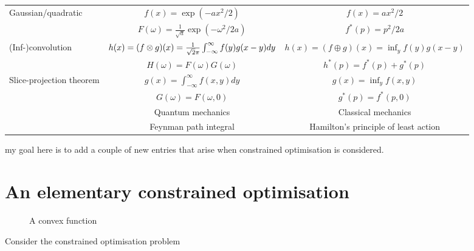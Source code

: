 \documentclass[10pt]{article}
\begin{document}
\begin{tabular}{| l | c | c |}
\hline

Gaussian/quadratic & $f(x) = \exp(-ax^2/2)$ & $f(x) = ax^2/2$ \\
& $F(\omega) = \frac{1}{\sqrt{a}}\exp(-\omega^2/2a)$ & $f^\ast(p) = p^2/2a$ \\

\hline

(Inf-)convolution & $h(x) = (f\otimes g)(x) = \frac{1}{\sqrt2\pi}\int_{-\infty}^{\infty} f(y)g(x-y)dy$ & $h(x) = (f\oplus g)(x) = \inf_y f(y)g(x-y)$ \\
& $H(\omega) = F(\omega)G(\omega)$ & $h^\ast(p) = f^\ast(p)+g^\ast(p)$ \\

\hline

Slice-projection theorem & $g(x)=\int_{-\infty}^\infty f(x,y)dy$ & $g(x)=\inf_y f(x,y)$ \\

& $G(\omega) = F(\omega,0)$ & $g^\ast(p) = f^\ast(p,0)$ \\
\hline

& Quantum mechanics & Classical mechanics \\

\hline

& Feynman path integral & Hamilton's principle of least action \\

\hline

\end{tabular}

my goal here is to add a couple of new entries that arise when constrained optimisation is considered.

\section{An elementary constrained optimisation}
\label{sec:opt}

\begin{figure}
\centering
{}
\caption{A convex function}
\label{convex}
\end{figure}
Consider the constrained optimisation problem
\end{document}
